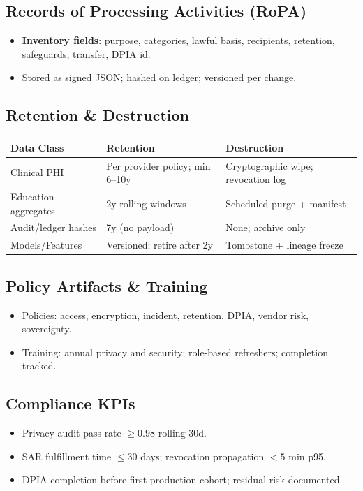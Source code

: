 \documentclass[11pt]{article}
\theoremstyle{plain}
\begin{document}
\subsection{Records of Processing Activities (RoPA)}
\begin{itemize}
  \item \textbf{Inventory fields}: purpose, categories, lawful basis, recipients, retention, safeguards, transfer, DPIA id.
  \item Stored as signed JSON; hashed on ledger; versioned per change.
\end{itemize}

\subsection{Retention \& Destruction}
\begin{center}
\begin{tabular}{l l l}
\hline
Data Class & Retention & Destruction \\
\hline
Clinical PHI & Per provider policy; min 6--10y & Cryptographic wipe; revocation log \\
Education aggregates & 2y rolling windows & Scheduled purge + manifest \\
Audit/ledger hashes & 7y (no payload) & None; archive only \\
Models/Features & Versioned; retire after 2y & Tombstone + lineage freeze \\
\hline
\end{tabular}
\end{center}

\subsection{Policy Artifacts \& Training}
\begin{itemize}
  \item Policies: access, encryption, incident, retention, DPIA, vendor risk, sovereignty.
  \item Training: annual privacy and security; role-based refreshers; completion tracked.
\end{itemize}

\subsection{Compliance KPIs}
\begin{itemize}
  \item Privacy audit pass-rate $\ge 0.98$ rolling 30d.
  \item SAR fulfillment time $\le 30$ days; revocation propagation $< 5$ min p95.
  \item DPIA completion before first production cohort; residual risk documented.
\end{itemize}
\end{document}
